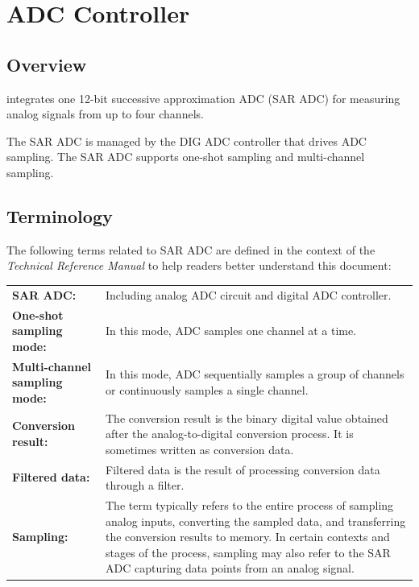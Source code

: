 \documentclass[main\_\_EN.tex]{subfiles}
\begin{document}

\ifglobal
\else
    \listoftodos
    {\let\clearpage\relax \listofdonetodos}
    \tableofcontents
\fi



\hypertarget{adc}{}
\chapter{ADC Controller}
\label{mod:adc}



\section{Overview}

\chipname{} integrates one 12-bit successive approximation ADC (SAR ADC) for measuring analog signals from up to four channels.

The SAR ADC is managed by the DIG ADC controller that drives ADC sampling. The SAR ADC supports one-shot sampling and multi-channel sampling.


\section{Terminology}

The following terms related to SAR ADC are defined in the context of the \textit{\chipname{} Technical Reference Manual} to help readers better understand this document:

\begin{longtable}{ R{6cm} p{10cm} }
\textbf{SAR ADC:} & Including analog ADC circuit and digital ADC controller. \\
\textbf{One-shot sampling mode:} & In this mode, ADC samples one channel at a time. \\
\textbf{Multi-channel sampling mode:} & In this mode, ADC sequentially samples a group of channels or continuously samples a single channel.  \\
\textbf{Conversion result:} & The conversion result is the binary digital value obtained after the analog-to-digital conversion process. It is sometimes written as conversion data.\\
\textbf{Filtered data:} & Filtered data is the result of processing conversion data through a filter.\\
\textbf{Sampling:} & The term typically refers to the entire process of sampling analog inputs, converting the sampled data, and transferring the conversion results to memory. In certain contexts and stages of the process, sampling may also refer to the SAR ADC capturing data points from an analog signal.\\
\end{longtable}
\end{document}
